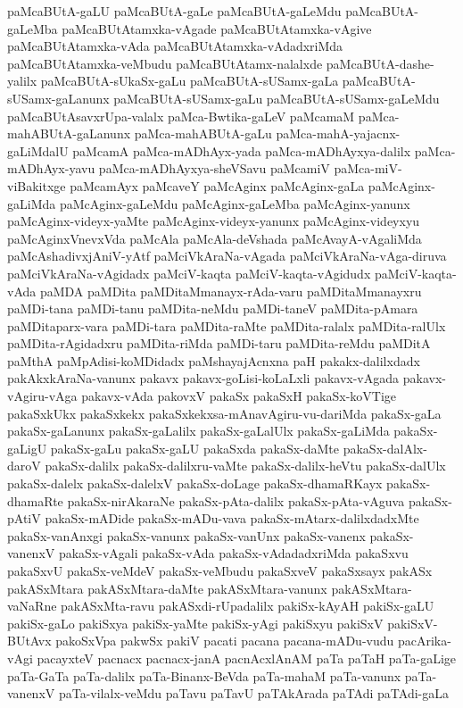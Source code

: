 {paMcaBUtA-gaLU
paMcaBUtA-gaLe
paMcaBUtA-gaLeMdu
paMcaBUtA-gaLeMba
paMcaBUtAtamxka-vAgade
paMcaBUtAtamxka-vAgive
paMcaBUtAtamxka-vAda
paMcaBUtAtamxka-vAdadxriMda
paMcaBUtAtamxka-veMbudu
paMcaBUtAtamx-nalalxde
paMcaBUtA-dashe-yalilx
paMcaBUtA-sUkaSx-gaLu
paMcaBUtA-sUSamx-gaLa
paMcaBUtA-sUSamx-gaLanunx
paMcaBUtA-sUSamx-gaLu
paMcaBUtA-sUSamx-gaLeMdu
paMcaBUtAsavxrUpa-valalx
paMca-Bwtika-gaLeV
paMcamaM
paMca-mahABUtA-gaLanunx
paMca-mahABUtA-gaLu
paMca-mahA-yajacnx-gaLiMdalU
paMcamA
paMca-mADhAyx-yada
paMca-mADhAyxya-dalilx
paMca-mADhAyx-yavu
paMca-mADhAyxya-sheVSavu
paMcamiV
paMca-miV-viBakitxge
paMcamAyx
paMcaveY
paMcAginx
paMcAginx-gaLa
paMcAginx-gaLiMda
paMcAginx-gaLeMdu
paMcAginx-gaLeMba
paMcAginx-yanunx
paMcAginx-videyx-yaMte
paMcAginx-videyx-yanunx
paMcAginx-videyxyu
paMcAginxVnevxVda
paMcAla
paMcAla-deVshada
paMcAvayA-vAgaliMda
paMcAshadivxjAniV-yAtf
paMciVkAraNa-vAgada
paMciVkAraNa-vAga-diruva
paMciVkAraNa-vAgidadx
paMciV-kaqta
paMciV-kaqta-vAgidudx
paMciV-kaqta-vAda
paMDA
paMDita
paMDitaMmanayx-rAda-varu
paMDitaMmanayxru
paMDi-tana
paMDi-tanu
paMDita-neMdu
paMDi-taneV
paMDita-pAmara
paMDitaparx-vara
paMDi-tara
paMDita-raMte
paMDita-ralalx
paMDita-ralUlx
paMDita-rAgidadxru
paMDita-riMda
paMDi-taru
paMDita-reMdu
paMDitA
paMthA
paMpAdisi-koMDidadx
paMshayajAcnxna
paH
pakakx-dalilxdadx
pakAkxkAraNa-vanunx
pakavx
pakavx-goLisi-koLaLxli
pakavx-vAgada
pakavx-vAgiru-vAga
pakavx-vAda
pakovxV
pakaSx
pakaSxH
pakaSx-koVTige
pakaSxkUkx
pakaSxkekx
pakaSxkekxsa-mAnavAgiru-vu-dariMda
pakaSx-gaLa
pakaSx-gaLanunx
pakaSx-gaLalilx
pakaSx-gaLalUlx
pakaSx-gaLiMda
pakaSx-gaLigU
pakaSx-gaLu
pakaSx-gaLU
pakaSxda
pakaSx-daMte
pakaSx-dalAlx-daroV
pakaSx-dalilx
pakaSx-dalilxru-vaMte
pakaSx-dalilx-heVtu
pakaSx-dalUlx
pakaSx-dalelx
pakaSx-dalelxV
pakaSx-doLage
pakaSx-dhamaRKayx
pakaSx-dhamaRte
pakaSx-nirAkaraNe
pakaSx-pAta-dalilx
pakaSx-pAta-vAguva
pakaSx-pAtiV
pakaSx-mADide
pakaSx-mADu-vava
pakaSx-mAtarx-dalilxdadxMte
pakaSx-vanAnxgi
pakaSx-vanunx
pakaSx-vanUnx
pakaSx-vanenx
pakaSx-vanenxV
pakaSx-vAgali
pakaSx-vAda
pakaSx-vAdadadxriMda
pakaSxvu
pakaSxvU
pakaSx-veMdeV
pakaSx-veMbudu
pakaSxveV
pakaSxsayx
pakASx
pakASxMtara
pakASxMtara-daMte
pakASxMtara-vanunx
pakASxMtara-vaNaRne
pakASxMta-ravu
pakASxdi-rUpadalilx
pakiSx-kAyAH
pakiSx-gaLU
pakiSx-gaLo
pakiSxya
pakiSx-yaMte
pakiSx-yAgi
pakiSxyu
pakiSxV
pakiSxV-BUtAvx
pakoSxVpa
pakwSx
pakiV
pacati
pacana
pacana-mADu-vudu
pacArika-vAgi
pacayxteV
pacnacx
pacnacx-janA
pacnAcxlAnAM
paTa
paTaH
paTa-gaLige
paTa-GaTa
paTa-dalilx
paTa-Binanx-BeVda
paTa-mahaM
paTa-vanunx
paTa-vanenxV
paTa-vilalx-veMdu
paTavu
paTavU
paTAkArada
paTAdi
paTAdi-gaLa
}
